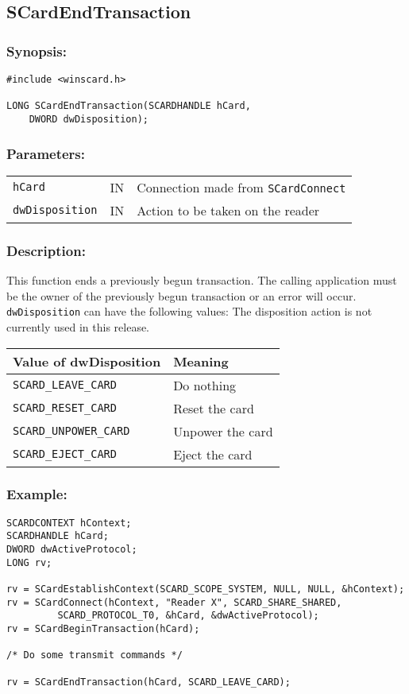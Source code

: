 \documentclass[a4paper,12pt]{article}
\newcommand{\synopsis}{\subsubsection{Synopsis:}}
\newcommand{\parameters}{\subsubsection{Parameters:}}
\newcommand{\desc}{\subsubsection{Description:}}
\newcommand{\example}{\subsubsection{Example:}}
\begin{document}
\subsection{SCardEndTransaction}

\synopsis

\begin{verbatim}
#include <winscard.h>

LONG SCardEndTransaction(SCARDHANDLE hCard,
    DWORD dwDisposition);
\end{verbatim}

\parameters

\begin{tabular}{lll}
\texttt{hCard} & IN & Connection made from \texttt{SCardConnect}\\
\texttt{dwDisposition} & IN & Action to be taken on the reader\\
\end{tabular}

\desc

This function ends a previously begun transaction.  The calling
application must be the owner of the previously begun transaction or an
error will occur.  \texttt{dwDisposition} can have the following values:
The disposition action is not currently used in this release.

\begin{tabular}{|l|l|}
\hline
Value of dwDisposition & Meaning \\
\hline
\hline
\texttt{SCARD\_LEAVE\_CARD} & Do nothing\\
\texttt{SCARD\_RESET\_CARD} & Reset the card\\
\texttt{SCARD\_UNPOWER\_CARD} & Unpower the card\\
\texttt{SCARD\_EJECT\_CARD} & Eject the card\\
\hline
\end{tabular}


\example

\begin{verbatim}
SCARDCONTEXT hContext;
SCARDHANDLE hCard;
DWORD dwActiveProtocol;
LONG rv;

rv = SCardEstablishContext(SCARD_SCOPE_SYSTEM, NULL, NULL, &hContext);
rv = SCardConnect(hContext, "Reader X", SCARD_SHARE_SHARED,
         SCARD_PROTOCOL_T0, &hCard, &dwActiveProtocol);
rv = SCardBeginTransaction(hCard);

/* Do some transmit commands */

rv = SCardEndTransaction(hCard, SCARD_LEAVE_CARD);
\end{verbatim}
\end{document}
